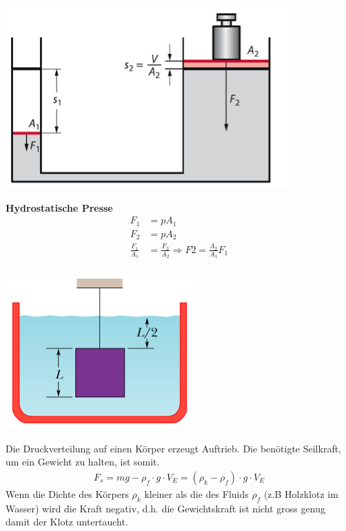 \documentclass[
a4paper,
oneside,
landscape, 
8pt,
]{scrartcl}
\begin{document}
\begin{multicols*}{2}
\begin{minipage}[h!]{0.4\linewidth}
\includegraphics[width=0.8\linewidth]{images/druck}
\end{minipage}
\hfill
\begin{minipage}[h!]{0.6\linewidth}
	\textbf{Hydrostatische Presse}
	\begin{align*}
	F_1 &=p A_1 \\
	F_2 &=p A_2 \\
	\frac{F_1}{A_1} &= \frac{F_2}{A_2} \Rightarrow
	F2 = \frac{A_2}{A_1} F_1 \\
	\end{align*}
\end{minipage}

\begin{minipage}[h!]{0.4\linewidth}
	\includegraphics[width=0.8\linewidth]{images/statischer_auftrieb}
\end{minipage}
\hfill
\begin{minipage}[h!]{0.6\linewidth}
	Die Druckverteilung auf einen Körper erzeugt Auftrieb. Die benötigte Seilkraft, um ein Gewicht zu halten, ist somit. 
	\begin{align*}
	F_s= m g - \rho_f \cdot g \cdot V_E =(\rho_k - \rho_f ) \cdot g \cdot V_E
	\end{align*}
	Wenn die Dichte des Körpers $\rho_k$ kleiner als die des Fluids $\rho_f$ (z.B Holzklotz im Wasser) wird die Kraft negativ, d.h. die Gewichtskraft ist nicht gross genug damit der Klotz untertaucht. 
\end{minipage}


\end{multicols*}
\end{document}
